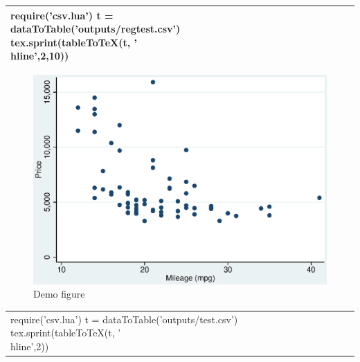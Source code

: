 \documentclass[a4paper]{article}
\begin{document}
\begin{table}
\centering
\begin{tabular}{lrrrrrrr}
  \hline
  \hline
  \luaexec{
    require('csv.lua')
    t = dataToTable('outputs/regtest.csv')
    tex.sprint(tableToTeX(t, '\\hline',{2,10}))
    } \\
  \hline
  \hline
  \end{tabular}
\end{table}

\begin{figure}
\centering
\includegraphics[width=1\textwidth]{outputs/figure.eps}
\caption{\label{fig:figure}Demo figure}
\end{figure}

\begin{table}
\centering
\begin{tabular}{l|rrrrrrr}
  \luaexec{
    require('csv.lua')
    t = dataToTable('outputs/test.csv')
    tex.sprint(tableToTeX(t, '\\hline',{2}))
    } \\
  \end{tabular}
\end{table}
\end{document}
